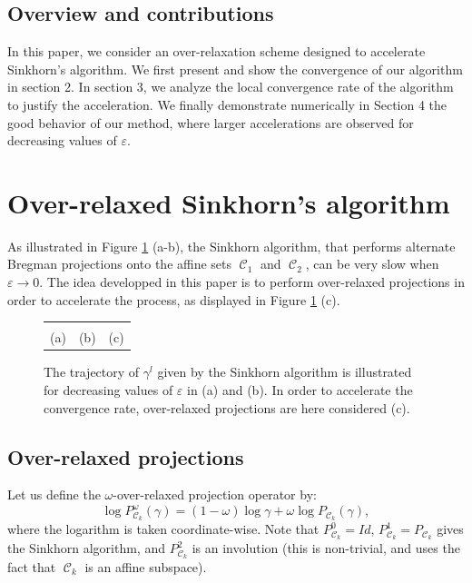 \documentclass{article} %
\DeclareMathOperator{\Ccal}{\mathcal{C}}
\renewcommand{\epsilon}{\varepsilon}
\theoremstyle{plain}
\theoremstyle{definition}
\theoremstyle{remark}
\begin{document}
\subsection{Overview and contributions}
In this paper, we consider an over-relaxation scheme designed to accelerate   Sinkhorn's algorithm. We first present and show the convergence of our algorithm in section 2. In section 3, we analyze the local convergence rate of the algorithm to justify the acceleration.
We finally demonstrate numerically  in Section 4 the good behavior of our method, where larger accelerations are observed for decreasing values of $\epsilon$.



\section{Over-relaxed Sinkhorn's algorithm}

As illustrated in Figure \ref{alternate_projections} (a-b), the Sinkhorn algorithm, that  performs alternate Bregman projections onto the affine sets $\Ccal_1$ and $\Ccal_2$, can be very slow when $\epsilon\to 0$. The idea developped in this paper is to perform over-relaxed projections in order to accelerate the process, as displayed in Figure \ref{alternate_projections} (c).

\begin{figure}[ht!]
\begin{center}
\begin{tabular}{ccc}
&
&
\\
(a)&(b)&(c)
\end{tabular}
\caption{\label{alternate_projections} The trajectory of $\gamma^l$ given by the Sinkhorn algorithm is illustrated for decreasing values of $\epsilon$ in (a) and (b). In order to accelerate the convergence rate, over-relaxed projections are here considered (c).}
\end{center}
\end{figure}
\subsection{Over-relaxed projections}

Let us define the $\omega$-over-relaxed projection operator by:
\begin{equation}\label{eq:def_or_proj}
\log P^\omega_{\Ccal_k}(\gamma) = (1-\omega) \log \gamma + \omega \log P_{\Ccal_k}(\gamma),
\end{equation}
where the logarithm is taken coordinate-wise.
Note that $P_{\Ccal_k}^0 = Id$, $P_{\Ccal_k}^1 = P_{\Ccal_k}$ gives the Sinkhorn algorithm, and $P_{\Ccal_k}^2$ is an involution (this is non-trivial, and uses the fact that $\Ccal_k$ is an affine subspace).
\end{document}
